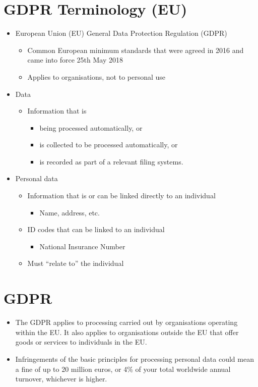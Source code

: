 \documentclass{article}
\begin{document}
\section{GDPR Terminology (EU)}
\begin{itemize}
 \item European Union (EU) General Data Protection Regulation (GDPR) 
 \begin{itemize}
   \item Common European minimum standards that were agreed in 2016 and came into force 25th May 2018
   \item Applies to organisations, not to personal use
 \end{itemize}
 \item Data
 \begin{itemize}
  \item Information that is
  \begin{itemize}
   \item being processed automatically, or 
   \item is collected to be processed automatically, or 
   \item is recorded as part of a relevant filing systems.
  \end{itemize}
 \end{itemize}
 \item Personal data
 \begin{itemize}
  \item Information that is or can be linked directly to an individual
  \begin{itemize}
   \item Name, address, etc.
  \end{itemize}
  \item ID codes that can be linked to an individual
  \begin{itemize}
   \item National Insurance Number
  \end{itemize}
  \item Must ``relate to'' the individual
 \end{itemize}
\end{itemize}




\section{GDPR}
\begin{itemize}
\item The GDPR applies to processing carried out by organisations operating within the EU. It also applies to organisations outside the EU that offer goods or services to individuals in the EU.
\item Infringements of the basic principles for processing personal data could mean a fine of up to 20 million euros, or 4\% of your total worldwide annual turnover, whichever is higher.
\end{itemize}
\end{document}
